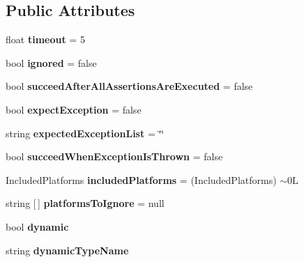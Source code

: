 \subsection*{Public Attributes}
\begin{DoxyCompactItemize}
\item 
\mbox{\label{class_unity_test_1_1_test_component_af4cd77585468577870d5bfab8772a83c}} 
float {\bfseries timeout} = 5
\item 
\mbox{\label{class_unity_test_1_1_test_component_af7ed18ecca6cd66b506d6ba98b5b88e6}} 
bool {\bfseries ignored} = false
\item 
\mbox{\label{class_unity_test_1_1_test_component_a1cbdc7ba5b4dc3fbc7a35acd560856a4}} 
bool {\bfseries succeed\+After\+All\+Assertions\+Are\+Executed} = false
\item 
\mbox{\label{class_unity_test_1_1_test_component_ad699c296a22322c7b226f3f7e8409f39}} 
bool {\bfseries expect\+Exception} = false
\item 
\mbox{\label{class_unity_test_1_1_test_component_a2bcf4e94b8c3e3fead957730cf39bba1}} 
string {\bfseries expected\+Exception\+List} = \char`\"{}\char`\"{}
\item 
\mbox{\label{class_unity_test_1_1_test_component_aa1dde6b57e49ce112c6c6c35bac6ec0b}} 
bool {\bfseries succeed\+When\+Exception\+Is\+Thrown} = false
\item 
\mbox{\label{class_unity_test_1_1_test_component_ad0974ad9049f18fa81e1e6afb1a9a53a}} 
Included\+Platforms {\bfseries included\+Platforms} = (Included\+Platforms) $\sim$0L
\item 
\mbox{\label{class_unity_test_1_1_test_component_a894a1ba8a360276f44ac055c7ea710f1}} 
string \mbox{[}$\,$\mbox{]} {\bfseries platforms\+To\+Ignore} = null
\item 
\mbox{\label{class_unity_test_1_1_test_component_aac21e49e09e62fcfeca16f8123ea54d7}} 
bool {\bfseries dynamic}
\item 
\mbox{\label{class_unity_test_1_1_test_component_a53d276310bc52647dbb55ba3273393e2}} 
string {\bfseries dynamic\+Type\+Name}
\end{DoxyCompactItemize}
